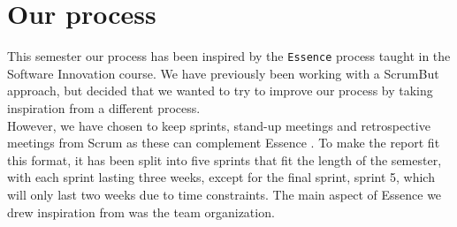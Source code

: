 \section{Our process}\label{sprint1:ourprocess}
This semester our process has been inspired by the \texttt{Essence} process taught in the Software Innovation course.
We have previously been working with a ScrumBut approach, but decided that we wanted to try to improve our process by taking inspiration from a different process.\\
However, we have chosen to keep sprints, stand-up meetings and retrospective meetings from Scrum as these can complement Essence \cite{Essence}.
To make the report fit this format, it has been split into five sprints that fit the length of the semester, with each sprint lasting three weeks, except for the final sprint, sprint 5, which will only last two weeks due to time constraints.
The main aspect of Essence we drew inspiration from was the team organization.

